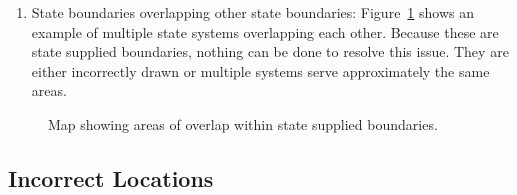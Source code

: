 \documentclass[12pt]{article}
\providecommand{\tightlist}{%
  \setlength{\itemsep}{0pt}\setlength{\parskip}{0pt}}
\begin{document}
\begin{enumerate}
\def\labelenumi{\arabic{enumi}.}
\setcounter{enumi}{1}
\tightlist
\item
  State boundaries overlapping other state boundaries:
  Figure~\ref{fig-overlap2} shows an example of multiple state systems
  overlapping each other. Because these are state supplied boundaries,
  nothing can be done to resolve this issue. They are either incorrectly
  drawn or multiple systems serve approximately the same areas.
\end{enumerate}

\begin{figure}


\caption{\label{fig-overlap2}Map showing areas of overlap within state
supplied boundaries.}

\end{figure}%

\subsection{Incorrect Locations}\label{incorrect-locations}
\end{document}
